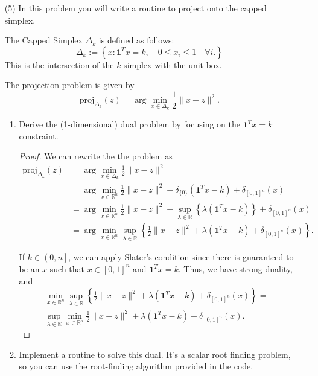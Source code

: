 \documentclass[11pt]{amsart}
\begin{document}
\vskip 16pt
\begin{enumerate}
\item[(5)] In this problem you will write a routine to project onto the capped simplex. 

The Capped Simplex $\Delta_k$ is defined as follows: 
\[
\Delta_k := \left\{x: \mathbf{1}^Tx = k, \quad 0 \leq x_i \leq 1 \quad \forall i. \right\}
\]
This is the intersection of the $k$-simplex with the unit box. 

The projection problem is given by 
\[
\mbox{proj}_{\Delta_k}(z) = \arg\min_{x \in \Delta_k} \frac{1}{2}\|x-z\|^2.
\]
\begin{enumerate}
\item Derive the (1-dimensional) dual problem by focusing on the $\mathbf{1}^Tx = k$ constraint. 
  \begin{proof}
    We can rewrite the the problem as
    \begin{align*}
      \mbox{proj}_{\Delta_k}(z)
      &= \arg\min_{x \in \Delta_k} \frac{1}{2}\|x-z\|^2 \\
      &= \arg\min_{x \in \mathbb{R}^n} \frac{1}{2}\|x-z\|^2 + \delta_{\{0\}}\left(\mathbf{1}^Tx - k \right) +
        \delta_{[0,1]^n}\left(x \right) \\
      &= \arg\min_{x \in \mathbb{R}^n} \frac{1}{2}\|x-z\|^2 +
        \sup_{\lambda \in \mathbb{R}}\left\{\lambda\left(\mathbf{1}^Tx - k \right)\right\} +
        \delta_{[0,1]^n}\left(x \right) \\
      &= \arg\min_{x \in \mathbb{R}^n} \sup_{\lambda \in \mathbb{R}}\left\{
        \frac{1}{2}\|x-z\|^2 +
        \lambda\left(\mathbf{1}^Tx - k \right) +
        \delta_{[0,1]^n}\left(x \right)
        \right\}.
    \end{align*}

    If $k \in \left(0, n\right]$, we can apply Slater's condition since there is
    guaranteed to be an $x$ such that $x \in [0, 1]^n$ and $\mathbf{1}^Tx =
    k$. Thus, we have strong duality, and
    \begin{align*}
      \min_{x \in \mathbb{R}^n} \sup_{\lambda \in \mathbb{R}}\left\{
        \frac{1}{2}\|x-z\|^2 +
        \lambda\left(\mathbf{1}^Tx - k \right) +
        \delta_{[0,1]^n}\left(x \right)
      \right\} = \\
      \boxed{\sup_{\lambda \in \mathbb{R}}\min_{x \in \mathbb{R}^n}
                \frac{1}{2}\|x-z\|^2 +
        \lambda\left(\mathbf{1}^Tx - k \right) +
      \delta_{[0,1]^n}\left(x\right).}
    \end{align*}        
  \end{proof}
\item Implement a routine to solve this dual. It's a scalar root finding problem, 
  so you can use the root-finding algorithm provided in the code.


\end{enumerate}
\end{enumerate}
\end{document}
